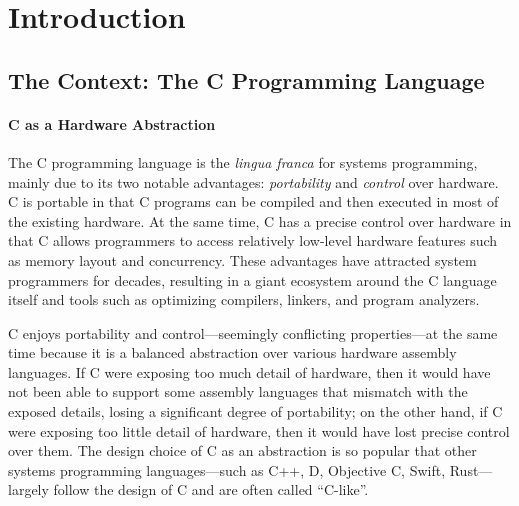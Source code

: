 \section{Introduction}
\label{sec:introduction}

\subsection{The Context: The C Programming Language}

\paragraph{C as a Hardware Abstraction}

The C programming language is the \emph{lingua franca} for systems programming, mainly due to its
two notable advantages: \emph{portability} and \emph{control} over hardware.  C is portable in that
C programs can be compiled and then executed in most of the existing hardware.  At the same time, C
has a precise control over hardware in that C allows programmers to access relatively low-level
hardware features such as memory layout and concurrency.  These advantages have attracted system
programmers for decades, resulting in a giant ecosystem around the C language itself and tools such
as optimizing compilers, linkers, and program analyzers.

C enjoys portability and control---seemingly conflicting properties---at the same time because it is
a balanced abstraction over various hardware assembly languages.  If C were exposing too much detail
of hardware, then it would have not been able to support some assembly languages that mismatch with
the exposed details, losing a significant degree of portability; on the other hand, if C were
exposing too little detail of hardware, then it would have lost precise control over them.  The
design choice of C as an abstraction is so popular that other systems programming languages---such
as C++, D, Objective C, Swift, Rust---largely follow the design of C and are often called
``C-like''.




